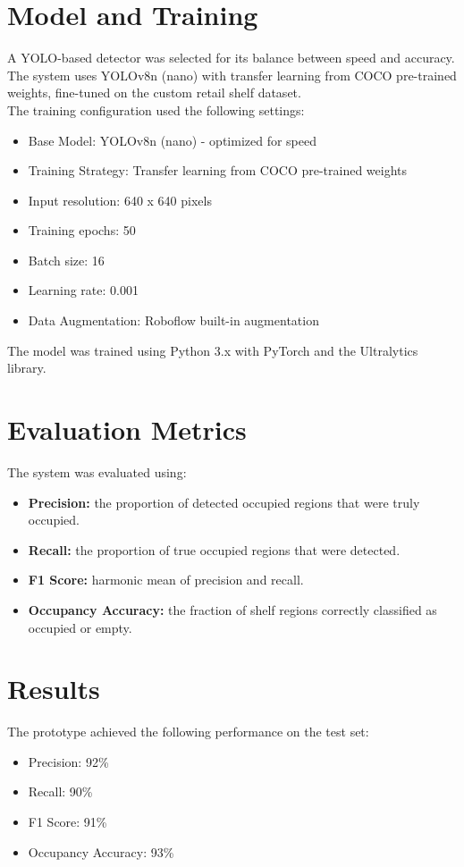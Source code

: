 \section{Model and Training}

A YOLO-based detector was selected for its balance between speed and accuracy. The system uses YOLOv8n (nano) with transfer learning from COCO pre-trained weights, fine-tuned on the custom retail shelf dataset.
\\
The training configuration used the following settings:
\begin{itemize}
    \item Base Model: YOLOv8n (nano) - optimized for speed
    \item Training Strategy: Transfer learning from COCO pre-trained weights
    \item Input resolution: 640 x 640 pixels
    \item Training epochs: 50
    \item Batch size: 16
    \item Learning rate: 0.001
    \item Data Augmentation: Roboflow built-in augmentation
\end{itemize}

The model was trained using Python 3.x with PyTorch and the Ultralytics library.

\section{Evaluation Metrics}

The system was evaluated using:
\begin{itemize}
    \item \textbf{Precision:} the proportion of detected occupied regions that were truly occupied.
    \item \textbf{Recall:} the proportion of true occupied regions that were detected.
    \item \textbf{F1 Score:} harmonic mean of precision and recall.
    \item \textbf{Occupancy Accuracy:} the fraction of shelf regions correctly classified as occupied or empty.
\end{itemize}

\section{Results}

The prototype achieved the following performance on the test set:
\begin{itemize}
    \item Precision: 92\%
    \item Recall: 90\%
    \item F1 Score: 91\%
    \item Occupancy Accuracy: 93\%
\end{itemize}


